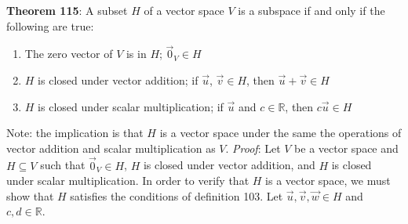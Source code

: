 \documentclass{exam}
\begin{document}
\textbf{Theorem 115}: A subset $H$ of a vector space $V$ is a subspace if and only if the following are true:
\begin{enumerate}[label=(\alph*)]
    \item The zero vector of $V$ is in $H$; $\Vec{0}_V\in H$
    \item $H$ is closed under vector addition; if $\Vec{u}$, $\Vec{v}\in H$, then $\Vec{u}+\Vec{v}\in H$
    \item $H$ is closed under scalar multiplication; if $\Vec{u}$ and $c\in\mathbb{R}$, then $c\Vec{u}\in H$
\end{enumerate}\newline
\vspace{0.2in}
\newline
Note: the implication is that $H$ is a vector space under the same the operations of vector addition and scalar multiplication as $V$.\newline
\vspace{0.2in}
\newline
\textit{Proof}: Let $V$ be a vector space and $H\subseteq V$ such that $\Vec{0}_V\in H$, $H$ is closed under vector addition, and $H$ is closed under scalar multiplication.  In order to verify that $H$ is a vector space, we must show that $H$ satisfies the conditions of definition 103. Let $\Vec{u}, \Vec{v}, \Vec{w}\in H$ and $c, d\in\mathbb{R}$. 
\end{document}
